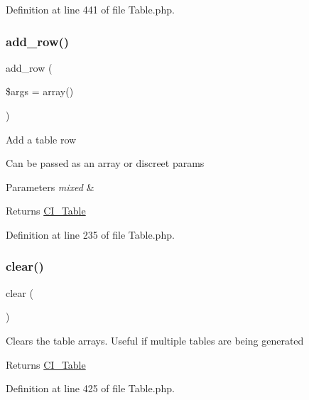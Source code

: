 Definition at line 441 of file Table.\+php.

\mbox{\label{class_c_i___table_aed032b02068e33116d9ecf9a0eedbbbe}} 
\subsubsection{\texorpdfstring{add\_row()}{add\_row()}}
{\footnotesize\ttfamily add\+\_\+row (\begin{DoxyParamCaption}\item[{}]{\$args = {\ttfamily array()} }\end{DoxyParamCaption})}

Add a table row

Can be passed as an array or discreet params


\begin{DoxyParams}{Parameters}
{\em mixed} & \\
\hline
\end{DoxyParams}
\begin{DoxyReturn}{Returns}
\mbox{\hyperlink{class_c_i___table}{C\+I\+\_\+\+Table}} 
\end{DoxyReturn}


Definition at line 235 of file Table.\+php.

\mbox{\label{class_c_i___table_aa821bec12eaa7e0f649397c9675ff505}} 
\subsubsection{\texorpdfstring{clear()}{clear()}}
{\footnotesize\ttfamily clear (\begin{DoxyParamCaption}{ }\end{DoxyParamCaption})}

Clears the table arrays. Useful if multiple tables are being generated

\begin{DoxyReturn}{Returns}
\mbox{\hyperlink{class_c_i___table}{C\+I\+\_\+\+Table}} 
\end{DoxyReturn}


Definition at line 425 of file Table.\+php.

\mbox{\label{class_c_i___table_ad46f79939e16f261c19157809d56aab8}} 
